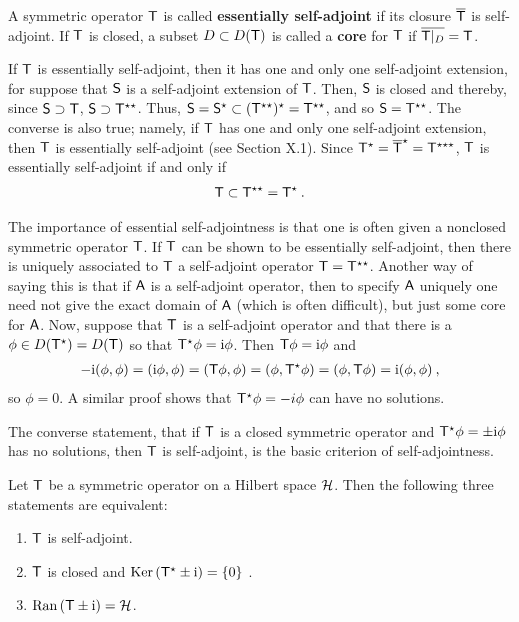 \begin{definition}
A symmetric operator $\mathsf{T}$ is called \textbf{essentially self-adjoint} if its closure $\overline{\mathsf{T}}$ is self-adjoint. If $\mathsf{T}$ is closed, a subset $D \subset D(\mathsf{T})$ is called a \textbf{core} for $\mathsf{T}$ if $\overline{\mathsf{T}|_{D}} = \mathsf{T}$. 
\end{definition}

If $\mathsf{T}$ is essentially self-adjoint, then it has one and only one self-adjoint extension, for suppose that $\mathsf{S}$ is a self-adjoint extension of $\mathsf{T}$. Then, $\mathsf{S}$ is closed and thereby, since $\mathsf{S} \supset \mathsf{T}$, $\mathsf{S} \supset \mathsf{T}^{\star \star}$. Thus, $\mathsf{S} = \mathsf{S}^\star \subset (\mathsf{T}^{\star \star})^\star = \mathsf{T}^{\star \star}$, and so
$\mathsf{S} = \mathsf{T}^{\star \star}$. The converse is also true; namely, if $\mathsf{T}$ has one and only one self-adjoint extension, then $\mathsf{T}$ is essentially self-adjoint (see Section X.1). Since
$\mathsf{T}^{\star} = \overline{\mathsf{T}}^{\star} = \mathsf{T}^{\star \star \star}$, $\mathsf{T}$ is essentially self-adjoint if and only if
\begin{align}
    \mathsf{T} \subset \mathsf{T}^{\star \star} = \mathsf{T}^{\star} \:.
\end{align}

The importance of essential self-adjointness is that one is often given a nonclosed symmetric operator $\mathsf{T}$. If $\mathsf{T}$ can be shown to be essentially self-adjoint, then there is uniquely associated to $\mathsf{T}$ a self-adjoint operator $\mathsf{T} = \mathsf{T}^{\star \star}$.
Another way of saying this is that if $\mathsf{A}$ is a self-adjoint operator, then to specify $\mathsf{A}$ uniquely one need not give the exact domain of $\mathsf{A}$ (which is often difficult), but just some core for $\mathsf{A}$. Now, suppose that $\mathsf{T}$ is a self-adjoint operator and that there is a $\phi \in D(\mathsf{T}^{\star}) = D(\mathsf{T}) $ so that $\mathsf{T}^{\star} \phi = \mathrm{i} \phi$. Then $\mathsf{T} \phi = \mathrm{i} \phi$ and
\begin{align}
    - \mathrm{i} (\phi, \phi) =(\mathrm{i} \phi, \phi) = (\mathsf{T} \phi, \phi) = (\phi, \mathsf{T}^\star \phi ) = (\phi, \mathsf{T} \phi) = \mathrm{i} (\phi, \phi) \:,
\end{align}
so $\phi = 0$. A similar proof shows that $\mathsf{T}^\star \phi = -i \phi$ can have no solutions. 

The converse statement, that if $\mathsf{T}$ is a closed symmetric operator and $\mathsf{T}^\star \phi = \pm \mathrm{i} \phi$ has no solutions, then $\mathsf{T}$ is self-adjoint, is the basic criterion of self-adjointness.

\begin{theorem}
    Let $\mathsf{T}$ be a symmetric operator on a Hilbert space $\mathcal{H}$. Then the following three statements are equivalent:
    \begin{enumerate}
        \item $\mathsf{T}$ is self-adjoint.
        \item $\mathsf{T}$ is closed and $\mathrm{Ker}\, (\mathsf{T}^\star \pm \mathrm{i}) = \left \lbrace 0 \right \rbrace$ \:.
        \item $\mathrm{Ran}\,(\mathsf{T} \pm \mathrm{i}) = \mathcal{H}$.
    \end{enumerate}
    
\end{theorem}

